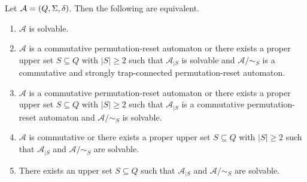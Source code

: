 \begin{proposition} \label{prelim:classes:solvable:prop:char-inductive}
Let $\mathcal A = (Q, \Sigma, \delta)$. Then the following are equivalent.
\begin{enumerate}
\item \label{prelim:classes:solvable:prop:char-inductive:1} $\mathcal A$ is solvable.	
	
\item \label{prelim:classes:solvable:prop:char-inductive:2} $\mathcal A$ is a commutative permutation-reset automaton or there exists a proper upper set $S \subseteq Q$
with $|S| \ge 2$ such that $\mathcal A_{|S}$ is solvable and $\mathcal A / {\sim_S}$ is a commutative
and strongly trap-connected permutation-reset automaton.

\item \label{prelim:classes:solvable:prop:char-inductive:3} $\mathcal A$ is a commutative permutation-reset automaton or there exists a proper upper set $S \subseteq Q$
with $|S| \ge 2$ such that $\mathcal A_{|S}$ is a commutative permutation-reset automaton
and $\mathcal A / {\sim_S}$ is solvable.
	
\item \label{prelim:classes:solvable:prop:char-inductive:4} $\mathcal A$ is commutative or there exists a proper upper set $S \subseteq Q$ with $|S| \ge 2$
such that $\mathcal A_{|S}$ and $\mathcal A / {\sim_S}$ are solvable. 
	
\item \label{prelim:classes:solvable:prop:char-inductive:5} There exists an upper set $S \subseteq Q$
such that $\mathcal A_{|S}$ and $\mathcal A / {\sim_S}$ are solvable. 
\end{enumerate}
\end{proposition}
